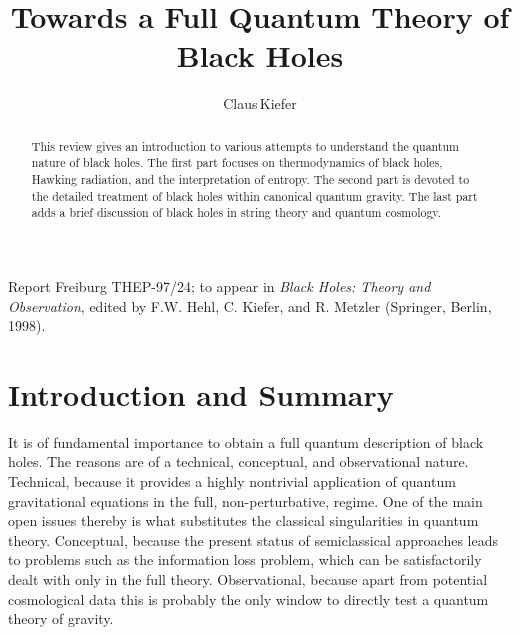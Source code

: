 \makeatletter
\let\chapter\hid@chapter
\makeatother
%
\newcommand{\be}{\begin{equation}}
\newcommand{\ee}{\end{equation}}
\newcommand{\bea}{\begin{eqnarray}}
\newcommand{\eea}{\end{eqnarray}}
\newcommand{\lb}{\label}
\newcommand{\hs}{\hspace}
%

\title{Towards a Full Quantum Theory of Black Holes}

\author{Claus\,Kiefer}


\maketitle

\begin{abstract}
This review gives an introduction to various attempts to
understand the quantum nature of black holes. The first part
focuses on thermodynamics of black holes, Hawking radiation,
and the interpretation of entropy. The second part is devoted
to the detailed treatment of black holes within canonical
quantum gravity. The last part adds a brief discussion 
of black holes in string theory and quantum cosmology.
\end{abstract}

\small
\noindent Report
     Freiburg THEP-97/24; to appear in {\em Black Holes: Theory and
     Observation}, edited by F.W. Hehl, C. Kiefer, and R. Metzler
     (Springer, Berlin, 1998).
\normalsize

\section{Introduction and Summary}
It is of fundamental importance to obtain a full quantum description
of black holes. The reasons are of a technical, conceptual, and
observational nature. Technical, because it provides a highly
nontrivial application of quantum gravitational equations
in the full, non-perturbative, regime. One of the main open issues thereby
is what substitutes the classical singularities in quantum theory.
 Conceptual, because
the present status of semiclassical approaches leads to problems
such as the information loss problem, which can be 
satisfactorily dealt with only in the full theory.
Observational, because apart from potential cosmological
data this is probably the only window to directly test a quantum
theory of gravity. 

